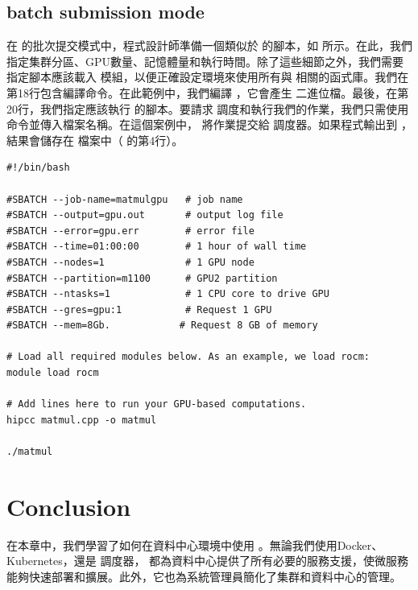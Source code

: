 \subsection{ batch submission mode}

在  的批次提交模式中，程式設計師準備一個類似於  的腳本，如  所示。在此，我們指定集群分區、GPU數量、記憶體量和執行時間。除了這些細節之外，我們需要指定腳本應該載入  模組，以便正確設定環境來使用所有與  相關的函式庫。我們在第18行包含編譯命令。在此範例中，我們編譯 ，它會產生  二進位檔。最後，在第20行，我們指定應該執行  的腳本。要請求  調度和執行我們的作業，我們只需使用  命令並傳入檔案名稱。在這個案例中， 將作業提交給  調度器。如果程式輸出到 ，結果會儲存在  檔案中（ 的第4行）。

\begin{lstlisting}[numbers=none, caption={matmul.bash \term{SLURM} 批次提交腳本。}, captionpos=t, label={lst:slurm_job_example}]
#!/bin/bash

#SBATCH --job-name=matmulgpu   # job name
#SBATCH --output=gpu.out       # output log file
#SBATCH --error=gpu.err        # error file  
#SBATCH --time=01:00:00        # 1 hour of wall time
#SBATCH --nodes=1              # 1 GPU node
#SBATCH --partition=m1100      # GPU2 partition
#SBATCH --ntasks=1             # 1 CPU core to drive GPU
#SBATCH --gres=gpu:1           # Request 1 GPU
#SBATCH --mem=8Gb.            # Request 8 GB of memory

# Load all required modules below. As an example, we load rocm:
module load rocm

# Add lines here to run your GPU-based computations.
hipcc matmul.cpp -o matmul

./matmul
\end{lstlisting}

\section{Conclusion}

在本章中，我們學習了如何在資料中心環境中使用 。無論我們使用Docker、Kubernetes，還是  調度器， 都為資料中心提供了所有必要的服務支援，使微服務能夠快速部署和擴展。此外，它也為系統管理員簡化了集群和資料中心的管理。